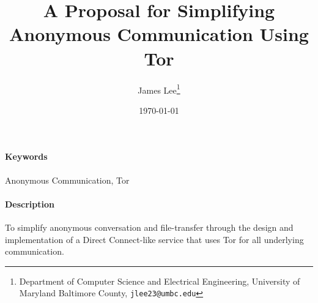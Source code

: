 \documentclass{article}
\title{A Proposal for Simplifying Anonymous Communication Using Tor}
\author{James Lee\thanks{
	Department of Computer Science and Electrical Engineering,
	University of Maryland Baltimore County,
	{\tt jlee23@umbc.edu}}}
\date{\today}
\begin{document}
\maketitle

\paragraph{Keywords} Anonymous Communication, Tor

\paragraph{Description} To simplify anonymous conversation and file-transfer through the design and implementation of a Direct Connect-like service that uses Tor for all underlying communication.
\end{document}
